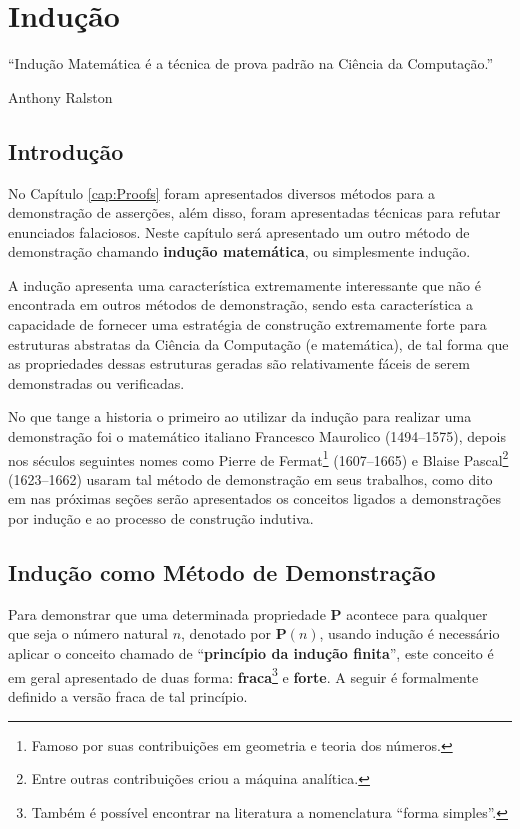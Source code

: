 \chapter{Indução}\label{cap:Induction}

\epigraph{``Indução Matemática é a técnica de prova padrão na Ciência da Computação.''}{Anthony Ralston}

\section{Introdução}\label{sec:InducaoIntroducao}

No Capítulo \ref{cap:Proofs} foram apresentados diversos métodos para a demonstração de asserções, além disso, foram apresentadas técnicas para refutar enunciados falaciosos. Neste capítulo será apresentado um outro método de demonstração chamando \textbf{indução matemática}, ou simplesmente indução. 

A indução apresenta uma característica extremamente interessante que não é encontrada em outros métodos de demonstração,  sendo esta característica a capacidade de fornecer uma estratégia de construção extremamente forte para estruturas abstratas da Ciência da Computação (e matemática), de tal forma que as propriedades dessas estruturas geradas são relativamente fáceis de serem demonstradas ou verificadas.

No que tange a historia o primeiro ao utilizar da indução para realizar uma demonstração foi o matemático italiano Francesco Maurolico (1494--1575), depois nos séculos seguintes nomes como Pierre de Fermat\footnote{Famoso por suas contribuições em geometria e teoria dos números.} (1607--1665) e Blaise Pascal\footnote{Entre outras contribuições criou a máquina analítica.} (1623--1662) usaram tal método de demonstração em seus trabalhos,  como dito em \cite{sussana2010-MD} nas próximas seções serão apresentados os conceitos ligados a demonstrações por indução e ao processo de construção indutiva.

\section{Indução como Método de Demonstração}\label{sec:InducaoFinita}

Para demonstrar que uma determinada propriedade \textbf{P} acontece para qualquer que seja o número natural $n$, denotado por \textbf{P}$(n)$,  usando indução é necessário aplicar o conceito chamado de ``\textbf{princípio da indução finita}'', este conceito é em geral apresentado de duas forma: \textbf{fraca}\footnote{Também é possível encontrar na literatura a nomenclatura ``forma simples''.} e \textbf{forte}. A seguir é formalmente definido a versão fraca de tal princípio.

